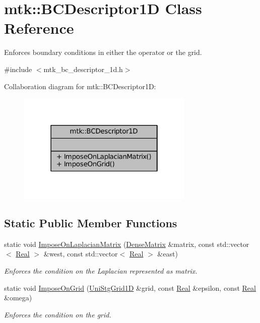 \hypertarget{classmtk_1_1BCDescriptor1D}{\section{mtk\+:\+:B\+C\+Descriptor1\+D Class Reference}
\label{classmtk_1_1BCDescriptor1D}
}


Enforces boundary conditions in either the operator or the grid.  




{\ttfamily \#include $<$mtk\+\_\+bc\+\_\+descriptor\+\_\+1d.\+h$>$}



Collaboration diagram for mtk\+:\+:B\+C\+Descriptor1\+D\+:\nopagebreak
\begin{figure}[H]
\begin{center}
\leavevmode
\includegraphics[width=238pt]{classmtk_1_1BCDescriptor1D__coll__graph}
\end{center}
\end{figure}
\subsection*{Static Public Member Functions}
\begin{DoxyCompactItemize}
\item 
static void \hyperlink{classmtk_1_1BCDescriptor1D_a33e51235eaa930e4470f027001a023cf}{Impose\+On\+Laplacian\+Matrix} (\hyperlink{classmtk_1_1DenseMatrix}{Dense\+Matrix} \&matrix, const std\+::vector$<$ \hyperlink{group__c01-roots_gac080bbbf5cbb5502c9f00405f894857d}{Real} $>$ \&west, const std\+::vector$<$ \hyperlink{group__c01-roots_gac080bbbf5cbb5502c9f00405f894857d}{Real} $>$ \&east)
\begin{DoxyCompactList}\small\item\em Enforces the condition on the Laplacian represented as matrix. \end{DoxyCompactList}\item 
static void \hyperlink{classmtk_1_1BCDescriptor1D_adfb101c1a12b452f83dacd207febea0a}{Impose\+On\+Grid} (\hyperlink{classmtk_1_1UniStgGrid1D}{Uni\+Stg\+Grid1\+D} \&grid, const \hyperlink{group__c01-roots_gac080bbbf5cbb5502c9f00405f894857d}{Real} \&epsilon, const \hyperlink{group__c01-roots_gac080bbbf5cbb5502c9f00405f894857d}{Real} \&omega)
\begin{DoxyCompactList}\small\item\em Enforces the condition on the grid. \end{DoxyCompactList}\end{DoxyCompactItemize}


